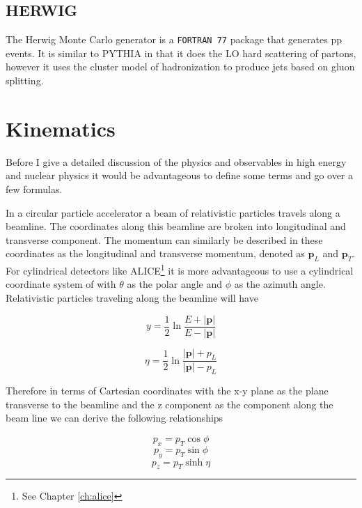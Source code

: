 \iffalse
\subsection{HERWIG}

The Herwig Monte Carlo generator is a \verb|FORTRAN 77| package that generates pp events.  It is similar to PYTHIA in that it does the LO hard scattering of partons, however it uses the cluster model of hadronization to produce jets based on gluon splitting.

\section{Kinematics}\label{sec:kinematics}


Before I give a detailed discussion of the physics and observables in high energy and nuclear physics it would be advantageous to define some terms and go over a few formulas.

In a circular particle accelerator a beam of relativistic particles travels along a beamline.  The coordinates along this beamline are broken into longitudinal and transverse component. The momentum can similarly be described in these coordinates as the longitudinal and transverse momentum, denoted as $\mathbf{p}_{L}$ and $\mathbf{p}_{T}$.  For cylindrical detectors like ALICE\footnote{See Chapter \ref{ch:alice}} it is more advantageous to use a cylindrical coordinate system of with $\theta$ as the polar angle and $\phi$ as the azimuth angle.  Relativistic particles traveling along the beamline will have 

\begin{equation}
\textit{y} = \frac{1}{2} \ln \frac{E + |\mathbf{p}|}{E - |\mathbf{p}|}
\label{eq:rapidity}
\end{equation}

\begin{equation}
\eta = \frac{1}{2} \ln \frac{|\mathbf{p}| + p_{L}}{|\mathbf{p}| - p_{L}}
\label{eq:psuedo}
\end{equation}

\noindent
Therefore in terms of Cartesian coordinates with the x-y plane as the plane transverse to the beamline and the z component as the component along the beam line we can derive the following relationships

\begin{equation}
p_{x} = p_{T} \cos \phi
\label{eq:xcomp}
\end{equation}
\begin{equation}
p_{y} = p_{T} \sin \phi
\label{eq:ycomp}
\end{equation}
\begin{equation}
p_{z} = p_{T} \sinh \eta
\label{eq:zcomp}
\end{equation}

